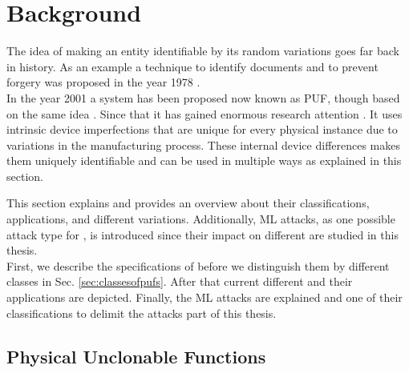 \chapter{Background}
\label{cap:background}

The idea of making an entity identifiable by its random variations goes far back in history.
As an example a technique to identify documents and to prevent forgery was proposed in the year 1978 \cite{1978MethodForgery}.\\
In the year 2001 a system has been proposed now known as \acf{PUF}, though based on the same idea \cite{Pappu2001PhysicalFunctions}.
Since that it has gained enormous research attention \cite{Becker2015ThePUFs}.
It uses intrinsic device imperfections that are unique for every physical instance due to variations in the manufacturing process.
These internal device differences makes them uniquely identifiable and can be used in multiple ways as explained in this section.

This section explains \pufs and provides an overview about their classifications, applications, and different variations.
Additionally, \ac{ML} attacks, as one possible attack type for \pufs, is introduced since their impact on different \pufs are studied in this thesis.\\
First, we describe the specifications of \pufs before we distinguish them by different classes in Sec. \ref{sec:classesofpufs}.
After that current different \pufs and their applications are depicted.
Finally, the \ac{ML} attacks are explained and one of their classifications to delimit the attacks part of this thesis.


\section{Physical Unclonable Functions}
\label{sec:pyhsicalunclonablefunctions}

